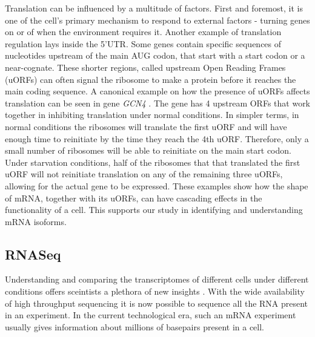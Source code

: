 \documentclass[12pt]{article}
\begin{document}
Translation can be influenced by a multitude of factors. First and foremost, it is one of the cell's primary mechanism to respond to external factors - turning genes on or of when the environment requires it. Another example of translation regulation lays inside the 5'\gls{UTR}. Some genes contain specific sequences of nucleotides upstream of the main AUG codon, that start with a start codon or a near-cognate. These shorter regions, called upstream Open Reading Frames (uORFs) can often signal the ribosome to make a protein before it reaches the main coding sequence. A canonical example on how the presence of uORFs affects translation can be seen in gene \textit{GCN4} \cite{Hinnebusch1997}. The gene has 4 upstream ORFs that work together in inhibiting translation under normal conditions. In simpler terms, in normal conditions the ribosomes will translate the first uORF and will have enough time to reinitiate by the time they reach the 4th uORF. Therefore, only a small number of ribosomes will be able to reinitiate on the main start codon. Under starvation conditions, half of the ribosomes that that translated the first uORF will not reinitiate translation on any of the remaining three uORFs, allowing for the actual gene to be expressed. These examples show how the shape of mRNA, together with its uORFs, can have cascading effects in the functionality of a cell. This supports our study in identifying and understanding mRNA isoforms. 

\subsection{RNASeq}
    Understanding and comparing the transcriptomes of different cells under different conditions offers sceintists a plethora of new insights \cite{Kertesz2010, Sen2015, Kapranov2002, ArzalluzLuque2018}. With the wide availability of high throughput sequencing it is now possible to sequence all the RNA  present in an experiment\cite{Kukurba2015, Wang2009}. In the current technological era, such an mRNA experiment usually gives information about millions of basepairs present in a cell. 
    
\end{document}
